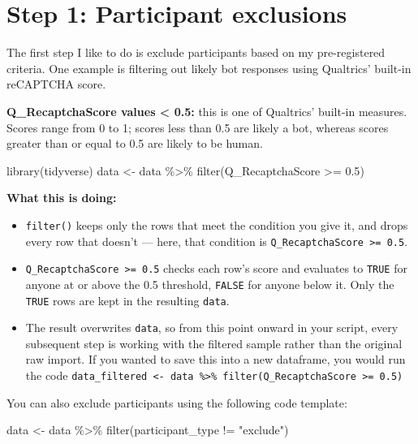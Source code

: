 \documentclass[
  letterpaper,
  DIV=11,
  numbers=noendperiod]{scrreprt}
\newenvironment{Shaded}{\begin{snugshade}}{\end{snugshade}}
\newcommand{\FloatTok}[1]{\textcolor[rgb]{0.68,0.00,0.00}{#1}}
\newcommand{\FunctionTok}[1]{\textcolor[rgb]{0.28,0.35,0.67}{#1}}
\newcommand{\NormalTok}[1]{\textcolor[rgb]{0.00,0.23,0.31}{#1}}
\newcommand{\OtherTok}[1]{\textcolor[rgb]{0.00,0.23,0.31}{#1}}
\newcommand{\SpecialCharTok}[1]{\textcolor[rgb]{0.37,0.37,0.37}{#1}}
\newcommand{\StringTok}[1]{\textcolor[rgb]{0.13,0.47,0.30}{#1}}
\providecommand{\tightlist}{%
  \setlength{\itemsep}{0pt}\setlength{\parskip}{0pt}}\usepackage{longtable,booktabs,array}
\begin{document}
\section{Step 1: Participant
exclusions}\label{step-1-participant-exclusions}

The first step I like to do is exclude participants based on my
pre-registered criteria. One example is filtering out likely bot
responses using Qualtrics' built-in reCAPTCHA score.

\textbf{Q\_RecaptchaScore values \textless{} 0.5:} this is one of
Qualtrics' built-in measures. Scores range from 0 to 1; scores less than
0.5 are likely a bot, whereas scores greater than or equal to 0.5 are
likely to be human.

\begin{Shaded}
\begin{Highlighting}[]
\FunctionTok{library}\NormalTok{(tidyverse)}
\NormalTok{data }\OtherTok{\textless{}{-}}\NormalTok{ data }\SpecialCharTok{\%\textgreater{}\%}
  \FunctionTok{filter}\NormalTok{(Q\_RecaptchaScore }\SpecialCharTok{\textgreater{}=} \FloatTok{0.5}\NormalTok{)}
\end{Highlighting}
\end{Shaded}

\textbf{What this is doing:}

\begin{itemize}
\tightlist
\item
  \texttt{filter()} keeps only the rows that meet the condition you give
  it, and drops every row that doesn't --- here, that condition is
  \texttt{Q\_RecaptchaScore\ \textgreater{}=\ 0.5}.
\item
  \texttt{Q\_RecaptchaScore\ \textgreater{}=\ 0.5} checks each row's
  score and evaluates to \texttt{TRUE} for anyone at or above the 0.5
  threshold, \texttt{FALSE} for anyone below it. Only the \texttt{TRUE}
  rows are kept in the resulting \texttt{data}.
\item
  The result overwrites \texttt{data}, so from this point onward in your
  script, every subsequent step is working with the filtered sample
  rather than the original raw import. If you wanted to save this into a
  new dataframe, you would run the code
  \texttt{data\_filtered\ \textless{}-\ data\ \%\textgreater{}\%\ filter(Q\_RecaptchaScore\ \textgreater{}=\ 0.5)}
\end{itemize}

You can also exclude participants using the following code template:

\begin{Shaded}
\begin{Highlighting}[]
\NormalTok{data }\OtherTok{\textless{}{-}}\NormalTok{ data }\SpecialCharTok{\%\textgreater{}\%}
  \FunctionTok{filter}\NormalTok{(participant\_type }\SpecialCharTok{!=} \StringTok{"exclude"}\NormalTok{)}
\end{Highlighting}
\end{Shaded}
\end{document}
